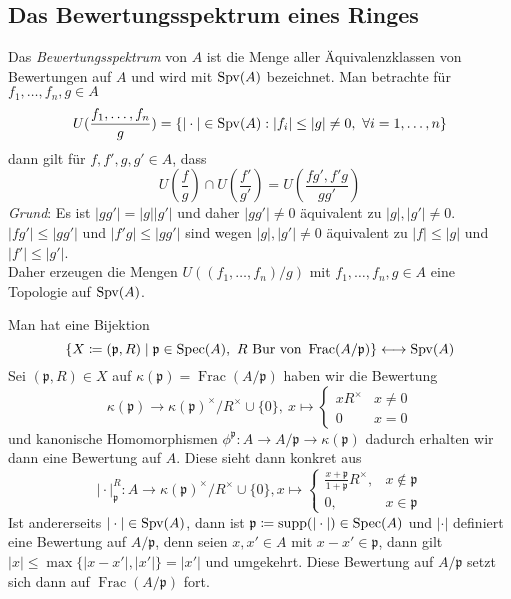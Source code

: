 \subsection*{Das Bewertungsspektrum eines Ringes}
\begin{defn}
    Das \textit{Bewertungsspektrum} von $A$ ist die Menge aller Äquivalenzklassen von Bewertungen auf $A$ und wird 
    mit $\operatorname{Spv}(A)$ bezeichnet. Man betrachte für $f_1,\ldots,f_n,g\in A$
    \[
    U(\frac{f_1,\ldots,f_n}{g}) = \{ \vert \cdot \vert \in \Spv{A} : \vert f_i\vert \le \vert g\vert \neq 0, \ \forall i=1,\ldots,n\}    
    \]
    dann gilt für $f,f',g,g'\in A$, dass 
    \[
    U(\frac{f}{g})\cap U(\frac{f'}{g'}) = U(\frac{fg',f'g}{gg'})    
    \]
    \textit{Grund}: Es ist $\vert gg'\vert = \vert g\vert \vert g'\vert$ und daher $\vert gg'\vert \neq 0$ äquivalent zu $\vert g\vert,\vert g'\vert \neq 0$. $\vert fg' \vert \le \vert gg'\vert$ und $\vert f'g \vert \le \vert gg'\vert$ sind wegen $\vert g\vert,\vert g'\vert \neq 0$ äquivalent zu $\vert f\vert \le \vert g\vert$ und $\vert f'\vert \le \vert g'\vert$.
    \\ Daher erzeugen die Mengen $U((f_1,\ldots,f_n)/g)$ mit $f_1,\ldots,f_n,g\in A$ eine Topologie auf $\operatorname{Spv}(A)$.
\end{defn}
Man hat eine Bijektion 
\[
\{ X\coloneqq (\mathfrak{p},R) \mid \mathfrak{p}\in \operatorname{Spec}(A), \ R \text{ Bur von } \operatorname{Frac}(A/\mathfrak{p}) \} \longleftrightarrow \operatorname{Spv}(A)    
\]
Sei $(\mathfrak{p},R)\in X$ auf $\kappa(\mathfrak{p})=\operatorname{Frac}(A/\mathfrak{p})$ haben wir die Bewertung
\[
\kappa(\mathfrak{p}) \to \kappa(\mathfrak{p})^\times / R^\times \cup \{0\}, \ x\mapsto \begin{cases}
    xR^\times & x\neq 0 \\
    0 & x=0
\end{cases}    
\]
und kanonische Homomorphismen $\phi^\mathfrak{p}:A\to A/\mathfrak{p} \to \kappa(\mathfrak{p})$ dadurch erhalten wir dann eine Bewertung auf $A$. Diese sieht dann konkret aus 
\[
\vert \cdot \vert_\mathfrak{p}^R : A\to \kappa(\mathfrak{p})^\times / R^\times \cup\{0\}, x \mapsto \begin{cases}
    \frac{x+\mathfrak{p}}{1+\mathfrak{p}}R^\times, & x\notin \mathfrak{p} \\
    0, & x\in \mathfrak{p}
\end{cases}  
\]
Ist andererseits $\vert \cdot \vert\in \operatorname{Spv}(A)$, dann ist $\mathfrak{p}\coloneqq \operatorname{supp}(\vert \cdot \vert)\in \operatorname{Spec}(A)$ und $\vert \cdot\vert$ definiert eine Bewertung auf $A/\mathfrak{p}$, denn seien $x,x'\in A$ mit $x-x'\in \mathfrak{p}$, dann gilt $\vert x\vert \le \max\{ \vert x-x'\vert,\vert x'\vert \}=\vert x'\vert$ und umgekehrt. Diese Bewertung auf $A/\mathfrak{p}$ setzt sich dann auf $\operatorname{Frac}(A/\mathfrak{p})$ fort.
